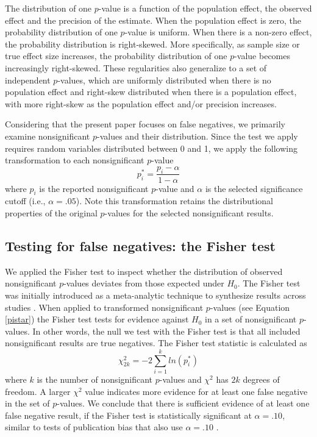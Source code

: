 \documentclass{article}
\begin{document}
The distribution of one $p$-value is a function of the population effect, the observed effect and the precision of the estimate. When the population effect is zero, the probability distribution of one $p$-value is uniform. When there is a non-zero effect, the probability distribution is right-skewed. More specifically, as sample size or true effect size increases, the probability distribution of one $p$-value becomes increasingly right-skewed. These regularities also generalize to a set of independent $p$-values, which are uniformly distributed when there is no population effect and right-skew distributed when there is a population effect, with more right-skew as the population effect and/or precision increases.

Considering that the present paper focuses on false negatives, we primarily examine nonsignificant $p$-values and their distribution. Since the test we apply requires random variables distributed between 0 and 1, we apply the following transformation to each  nonsignificant $p$-value
\begin{equation}
\label{pistar}
p^*_i=\frac{p_i-\alpha}{1-\alpha}
\end{equation}
where $p_i$ is the  reported nonsignificant $p$-value and $\alpha$ is the selected significance cutoff (i.e., $\alpha=.05$). Note this transformation retains the distributional properties of the original $p$-values for the selected nonsignificant results.

\subsection*{Testing for false negatives: the Fisher test}

We applied the Fisher test to inspect whether the distribution of observed nonsignificant $p$-values deviates from those expected under $H_0$. The Fisher test was initially introduced as a meta-analytic technique to synthesize results across studies \cite{Fisher1925-jl,Hedges1985-dy}. When applied to transformed nonsignificant $p$-values (see Equation \ref{pistar}) the Fisher test tests for evidence against $H_0$ in a set of nonsignificant $p$-values. In other words, the null we test with the Fisher test is that all included nonsignificant results are true negatives. The Fisher test statistic is calculated as
\begin{equation}
\label{fishertest}
\chi^2_{2k}=-2\sum\limits^k_{i=1}ln(p^*_i)
\end{equation}
where $k$ is the number of nonsignificant $p$-values and $\chi^2$ has $2k$ degrees of freedom. A larger $\chi^2$ value indicates more evidence for at least one false negative in the set of $p$-values. We conclude that there is sufficient evidence of at least one false negative result, if the Fisher test is statistically significant at $\alpha=.10$, similar to tests of publication bias that also use $\alpha=.10$ \cite{Sterne2000-wh,Ioannidis2007-hh,Francis2012-kw}.
\end{document}
